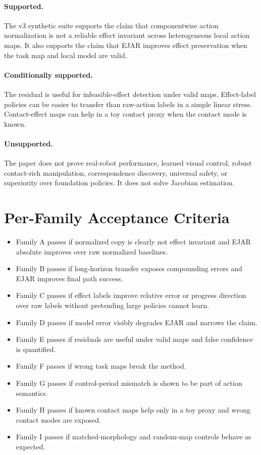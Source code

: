 \documentclass{article}
\begin{document}
\paragraph{Supported.}
The v3 synthetic suite supports the claim that componentwise action normalization is not a reliable effect invariant across heterogeneous local action maps. It also supports the claim that EJAR improves effect preservation when the task map and local model are valid.

\paragraph{Conditionally supported.}
The residual is useful for infeasible-effect detection under valid maps. Effect-label policies can be easier to transfer than raw-action labels in a simple linear stress. Contact-effect maps can help in a toy contact proxy when the contact mode is known.

\paragraph{Unsupported.}
The paper does not prove real-robot performance, learned visual control, robust contact-rich manipulation, correspondence discovery, universal safety, or superiority over foundation policies. It does not solve Jacobian estimation.

\section{Per-Family Acceptance Criteria}

\begin{itemize}
\item Family A passes if normalized copy is clearly not effect invariant and EJAR absolute improves over raw normalized baselines.
\item Family B passes if long-horizon transfer exposes compounding errors and EJAR improves final path success.
\item Family C passes if effect labels improve relative error or progress direction over raw labels without pretending large policies cannot learn.
\item Family D passes if model error visibly degrades EJAR and narrows the claim.
\item Family E passes if residuals are useful under valid maps and false confidence is quantified.
\item Family F passes if wrong task maps break the method.
\item Family G passes if control-period mismatch is shown to be part of action semantics.
\item Family H passes if known contact maps help only in a toy proxy and wrong contact modes are exposed.
\item Family I passes if matched-morphology and random-map controls behave as expected.
\end{itemize}
\end{document}
